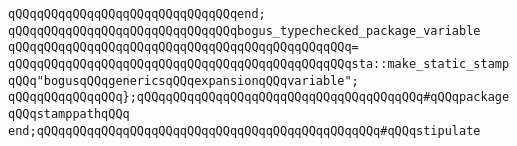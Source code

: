 \verb|qQQqqQQqqQQqqQQqqQQqqQQqqQQqqQQqend;|\newline
\newline
\newline
\verb|qQQqqQQqqQQqqQQqqQQqqQQqqQQqqQQqbogus_typechecked_package_variable|\newline
\verb|qQQqqQQqqQQqqQQqqQQqqQQqqQQqqQQqqQQqqQQqqQQqqQQq=|\newline
\verb|qQQqqQQqqQQqqQQqqQQqqQQqqQQqqQQqqQQqqQQqqQQqqQQqsta::make_static_stampqQQq"bogusqQQqgenericsqQQqexpansionqQQqvariable";|\newline
\newline
\newline
\verb|qQQqqQQqqQQqqQQq};qQQqqQQqqQQqqQQqqQQqqQQqqQQqqQQqqQQqqQQq#qQQqpackageqQQqstamppathqQQq|\newline
\verb|end;qQQqqQQqqQQqqQQqqQQqqQQqqQQqqQQqqQQqqQQqqQQqqQQq#qQQqstipulate|\newline
\newline

